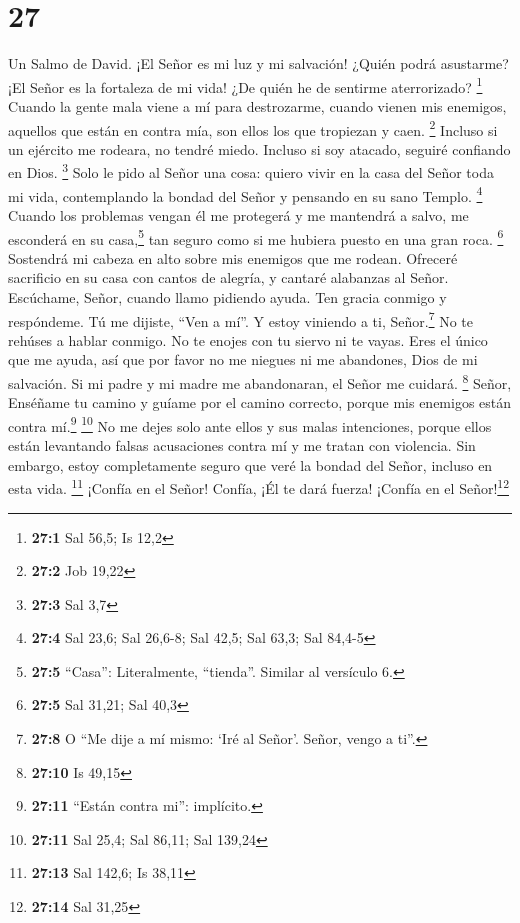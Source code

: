 \hypertarget{section-26}{%
\section{27}\label{section-26}}

Un Salmo de David.  ¡El Señor es mi luz y mi salvación!
¿Quién podrá asustarme? ¡El Señor es la fortaleza de mi vida! ¿De quién
he de sentirme aterrorizado? \footnote{\textbf{27:1} Sal 56,5; Is 12,2}
 Cuando la gente mala viene a mí para destrozarme, cuando
vienen mis enemigos, aquellos que están en contra mía, son ellos los que
tropiezan y caen. \footnote{\textbf{27:2} Job 19,22} 
Incluso si un ejército me rodeara, no tendré miedo. Incluso si soy
atacado, seguiré confiando en Dios. \footnote{\textbf{27:3} Sal 3,7}
 Solo le pido al Señor una cosa: quiero vivir en la casa
del Señor toda mi vida, contemplando la bondad del Señor y pensando en
su sano Templo. \footnote{\textbf{27:4} Sal 23,6; Sal 26,6-8; Sal 42,5;
  Sal 63,3; Sal 84,4-5}  Cuando los problemas vengan él me
protegerá y me mantendrá a salvo, me esconderá en su casa,\footnote{\textbf{27:5}
  ``Casa'': Literalmente, ``tienda''. Similar al versículo 6.} tan
seguro como si me hubiera puesto en una gran roca. \footnote{\textbf{27:5}
  Sal 31,21; Sal 40,3}  Sostendrá mi cabeza en alto sobre
mis enemigos que me rodean. Ofreceré sacrificio en su casa con cantos de
alegría, y cantaré alabanzas al Señor.  Escúchame, Señor,
cuando llamo pidiendo ayuda. Ten gracia conmigo y respóndeme.
 Tú me dijiste, ``Ven a mí''. Y estoy viniendo a ti,
Señor.\footnote{\textbf{27:8} O ``Me dije a mí mismo: `Iré al Señor'.
  Señor, vengo a ti''.}  No te rehúses a hablar conmigo.
No te enojes con tu siervo ni te vayas. Eres el único que me ayuda, así
que por favor no me niegues ni me abandones, Dios de mi salvación.
 Si mi padre y mi madre me abandonaran, el Señor me
cuidará. \footnote{\textbf{27:10} Is 49,15}  Señor,
Enséñame tu camino y guíame por el camino correcto, porque mis enemigos
están contra mí.\footnote{\textbf{27:11} ``Están contra mi'': implícito.}
\footnote{\textbf{27:11} Sal 25,4; Sal 86,11; Sal 139,24}
 No me dejes solo ante ellos y sus malas intenciones,
porque ellos están levantando falsas acusaciones contra mí y me tratan
con violencia.  Sin embargo, estoy completamente seguro
que veré la bondad del Señor, incluso en esta vida. \footnote{\textbf{27:13}
  Sal 142,6; Is 38,11}  ¡Confía en el Señor! Confía, ¡Él
te dará fuerza! ¡Confía en el Señor!\footnote{\textbf{27:14} Sal 31,25}

